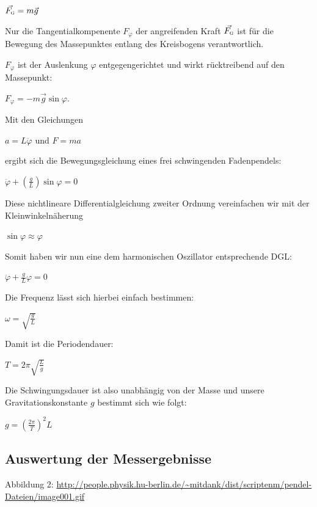 \documentclass[11pt,a4paper,titlepage, ngerman]{article}
\begin{document}
			\begin{center}
				{ $ \vec{F_\textsc{g}} = m\vec{g}$} 
			\end{center}
			
			Nur die Tangentialkompenente $F_\varphi$ der angreifenden Kraft $ \vec{F_\textsc{g}}$ ist für die Bewegung des Massepunktes entlang des Kreisbogens verantwortlich.   	
			  
			$F_\varphi$ ist der Auslenkung $\varphi$ entgegengerichtet und wirkt  rücktreibend auf den Massepunkt:
			
			\begin{center}  
				$F_\varphi = - m\vec{g} \sin\varphi.$ 
			\end{center}
			
			Mit den Gleichungen 
			\begin{center}
				$a = L \ddot{\varphi}$ und $F = ma$ 
			\end{center}
		
			ergibt sich die Bewegungsgleichung eines frei schwingenden Fadenpendels: 
			\begin{center}
				$\ddot{\varphi}+\left( \frac{g}{L}\right)  \sin \varphi = 0$	
			\end{center}
			
			Diese nichtlineare Differentialgleichung zweiter Ordnung vereinfachen wir mit der Kleinwinkelnäherung
			\begin{center}
				$\sin \varphi \approx \varphi $	
			\end{center} 
			
			Somit haben wir nun eine dem harmonischen Oszillator entsprechende DGL:
			\begin{center}
				$\ddot{\varphi}+\frac{g}{L} \varphi = 0$	
			\end{center}
			
			Die Frequenz lässt sich hierbei einfach bestimmen: 
			\begin{center}
				$\omega =  \sqrt{\frac{g}{L}}$
			\end{center}
			
			Damit ist die Periodendauer:
			\begin{center}
				$T =  2\pi \sqrt{\frac{L}{g}}$
			\end{center} 
		
			Die Schwingungsdauer ist also unabhängig von der Masse und unsere Gravitationskonstante $g$ bestimmt sich wie folgt:
			\begin{center}
				$g = (\frac{2 \pi}{T})^2 L$
			\end{center} 
		
		\subsection{Auswertung der Messergebnisse}
		\label{Auswertung}
		
		
		
		\begin{thebibliography}{9}		
			\item[Abbildung 2:] \url{http://people.physik.hu-berlin.de/~mitdank/dist/scriptenm/pendel-Dateien/image001.gif}			
		\end{thebibliography}	
			
\end{document}
